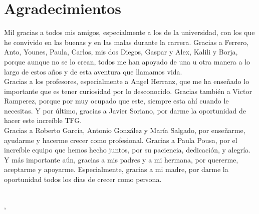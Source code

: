 \ifspanish
\else
\fi

%
%
\cleardoublepage
{} %

\chapter*{Agradecimientos} %

Mil gracias a todos mis amigos, especialmente a los de la universidad, con los que he convivido en las buenas y en las malas durante la carrera. Gracias a Ferrero, Anto, Younes, Paula, Carlos, mis dos Diegos, Gaspar y Alex, Kalili y Borja, porque aunque no se lo crean, todos me han apoyado de una u otra manera a lo largo de estos años y de esta aventura que llamamos vida. \\

Gracias a los profesores, especialmente a Angel Herranz, que me ha enseñado lo importante que es tener curiosidad por lo desconocido. Gracias también a Victor Ramperez, porque por muy ocupado que este, siempre esta ahí cuando le necesitas. Y por último, gracias a Javier Soriano, por darme la oportunidad de hacer este increíble TFG. \\

Gracias a Roberto García, Antonio González y María Salgado, por enseñarme, ayudarme y hacerme crecer como profesional. Gracias a Paula Pousa, por el increíble equipo que hemos hecho juntos, por su paciencia, dedicación, y alegría. \\

Y más importante aún, gracias a mis padres y a mi hermana, por quererme, aceptarme y apoyarme. Especialmente, gracias a mi madre, por darme la oportunidad todos los días de crecer como persona. 

\makeatletter		
\begin{flushright}
	\vspace{1,5cm}
	\textit{\@autor}\\
	\@lugarDef, \@yearDef
\end{flushright}
\makeatother
